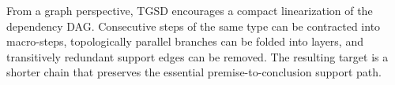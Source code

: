 
From a graph perspective, TGSD encourages a compact linearization of the dependency DAG. Consecutive steps of the same type can be contracted into macro-steps, topologically parallel branches can be folded into layers, and transitively redundant support edges can be removed. The resulting target is a shorter chain that preserves the essential premise-to-conclusion support path.



